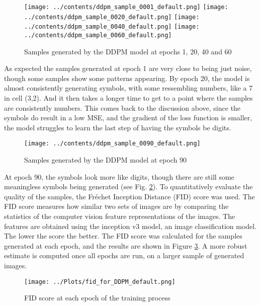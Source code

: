 \documentclass[12pt]{report} %
\begin{document}
\begin{figure}[ht]
  \centering
  \texttt{[image: ../contents/ddpm\_sample\_0001\_default.png]}
  \texttt{[image: ../contents/ddpm\_sample\_0020\_default.png]}
  \texttt{[image: ../contents/ddpm\_sample\_0040\_default.png]}
  \texttt{[image: ../contents/ddpm\_sample\_0060\_default.png]}
  \captionsetup{font=footnotesize}
  \caption{Samples generated by the DDPM model at epochs 1, 20, 40 and 60}
  \label{fig:ddpm_samples}
\end{figure}

\newpage
As expected the samples generated at epoch 1 are very close to being just noise, though some samples show some patterns appearing. By epoch 20, the model is almost consistently generating symbols, with some ressembling numbers, like a 7 in cell (3,2). And it then takes a longer time to get to a point where the samples are consistently numbers. This comes back to the discussion above, since the symbols do result in a low MSE, and the gradient of the loss function is smaller, the model struggles to learn the last step of having the symbols be digits.

\newpage
\begin{figure}[ht]
  \centering
  \texttt{[image: ../contents/ddpm\_sample\_0090\_default.png]}
  \captionsetup{font=footnotesize}
  \caption{Samples generated by the DDPM model at epoch 90}
  \label{fig:ddpm_samples2}
\end{figure}

At epoch 90, the symbols look more like digits, though there are still some meaningless symbols being generated (see Fig. \ref{fig:ddpm_samples2}). To quantitatively evaluate the quality of the samples, the Fréchet Inception Distance (FID) score was used. The FID score measures how similar two sets of images are by comparing the statistics of the computer vision feature representations of the images. The features are obtained using the inception v3 model, an image classification model\cite{fid}. The lower the score the better. The FID score was calculated for the samples generated at each epoch, and the results are shown in Figure \ref{fig:fid_ddpm}. A more robust estimate is computed once all epochs are run, on a larger sample of generated images.


\begin{figure}[ht]
  \centering
  \texttt{[image: ../Plots/fid\_for\_DDPM\_default.png]}
  \captionsetup{font=footnotesize}
  \caption{FID score at each epoch of the training process}
  \label{fig:fid_ddpm}
\end{figure}
\end{document}
